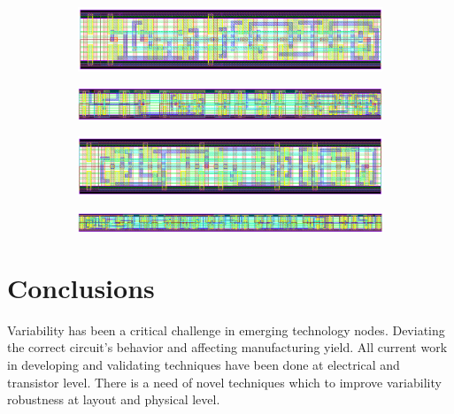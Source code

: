 \documentclass[ecp,tc, english]{iiufrgs}
\begin{document}
\begin{figure}[H]
\centering
\begin{subfigure}[b]{\textwidth}
   \includegraphics[width=1\linewidth]{TFA.png}
   \caption{}
   \label{fig:Ng1} 
\end{subfigure}

\begin{subfigure}[b]{\textwidth}
   \includegraphics[width=1\linewidth]{TFAST.png}
   \caption{}
   \label{fig:Ng2}
\end{subfigure}

\caption{}
\end{figure}

\begin{figure}[H]
\centering
\begin{subfigure}[b]{\textwidth}
   \includegraphics[width=1\linewidth]{HYBRID.png}
   \caption{}
   \label{fig:Ng1} 
\end{subfigure}

\begin{subfigure}[b]{\textwidth}
   \includegraphics[width=1\linewidth]{HYBRIDST.png}
   \caption{}
   \label{fig:Ng2}
\end{subfigure}

\caption{}
\end{figure}

\chapter{Conclusions}
Variability has been a critical challenge in emerging technology nodes. Deviating the correct circuit’s behavior and affecting manufacturing yield. All current work in developing and validating techniques have been done at electrical and transistor level. There is a need of novel techniques which to improve variability robustness at layout and physical level.
\end{document}

